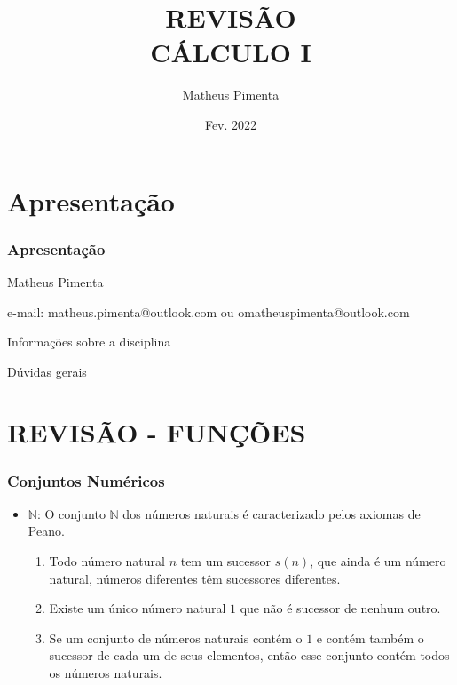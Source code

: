 \documentclass[hyperref={pdfpagelabels=false}]{beamer}
\title{REVISÃO \\ CÁLCULO I}
\author[Matheus Pimenta]{Matheus Pimenta}
\institute[UEL]{\normalsize Universidade Estadual de Londrina \\
	Londrina
}
\date{Fev. 2022}
\begin{document}
	
\begin{frame}
\titlepage
\end{frame} 




\section{Apresentação} 


\begin{frame}
\frametitle{Apresentação} 

Matheus Pimenta \pause

e-mail: matheus.pimenta@outlook.com ou omatheuspimenta@outlook.com \pause

Informações sobre a disciplina \pause

Dúvidas gerais


\end{frame}

\section{REVISÃO - FUNÇÕES}

\begin{frame}
\frametitle{Conjuntos Numéricos}
\begin{itemize}
 \item $\mathbb{N}$: O conjunto $\mathbb{N}$	dos números naturais é caracterizado pelos axiomas de Peano.

    \begin{enumerate}
        \item Todo número natural $n$ tem um sucessor $s(n)$, que ainda é um número natural, números diferentes têm sucessores diferentes. \pause
        \item Existe um único número natural $1$ que não é sucessor de nenhum outro. \pause
        \item Se um conjunto de números naturais contém o $1$ e contém também o sucessor de cada um de seus elementos, então esse conjunto contém todos os números naturais. \pause
    \end{enumerate}

\end{itemize}

\end{frame}
\end{document}
